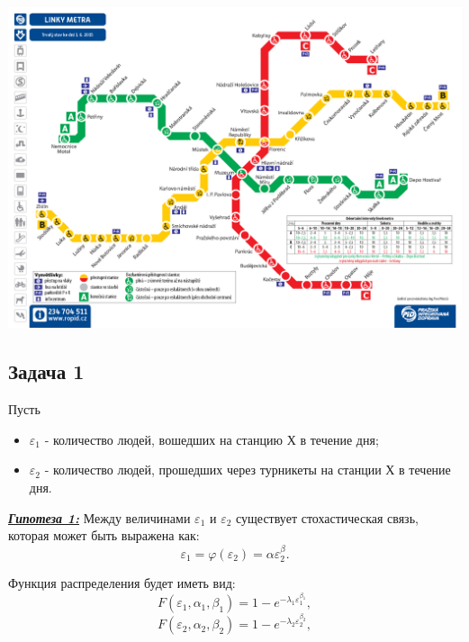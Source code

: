 \documentclass[a4paper, 12pt]{article}   	%
\begin{document}
    \begin{center}
        \begin{minipage}{0.9\linewidth}
            \includegraphics[width=\linewidth]{img/metro-praha}
        \end{minipage}
    \end{center}

    
\subsection{Задача 1}
    Пусть 
    \begin{itemize}
        \item $\varepsilon_1$ - количество людей, вошедших на станцию $Х$ в течение дня;
        \item $\varepsilon_2$ - количество людей, прошедших через турникеты на станции $Х$ в течение дня.
    \end{itemize}
    
    \textit{\textbf{\underline{Гипотеза 1:}}} Между величинами $\varepsilon_1$ и $\varepsilon_2$ существует стохастическая связь, которая может быть выражена как:
    \begin{equation}
        \varepsilon_1 = \varphi(\varepsilon_2) = \alpha \varepsilon_2^\beta.
    \end{equation}
    
    Функция распределения будет иметь вид:
    \begin{equation}
        F(\varepsilon_1, \alpha_1, \beta_1) = 1 - e^{-\lambda_1 \varepsilon_1^{\beta_1}},
    \end{equation}
    \begin{equation}
        F(\varepsilon_2, \alpha_2, \beta_2) = 1 - e^{-\lambda_2 \varepsilon_2^{\beta_2}},
    \end{equation}
    
\end{document}

